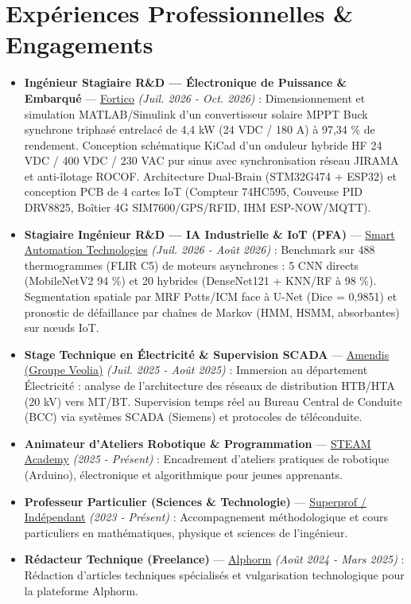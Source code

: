 \documentclass[10pt,a4paper]{article}
\begin{document}
\section*{Exp\'eriences Professionnelles \& Engagements}
\begin{itemize}
\item \textbf{Ingénieur Stagiaire R\&D --- Électronique de Puissance \& Embarqué} --- \href{https://sitewebfortico.vercel.app/fr}{Fortico} \textit{(Juil. 2026 - Oct. 2026)} : Dimensionnement et simulation MATLAB/Simulink d'un convertisseur solaire MPPT Buck synchrone triphasé entrelacé de 4,4 kW (24 VDC / 180 A) à 97,34 \% de rendement. Conception schématique KiCad d'un onduleur hybride HF 24 VDC / 400 VDC / 230 VAC pur sinus avec synchronisation réseau JIRAMA et anti-îlotage ROCOF. Architecture Dual-Brain (STM32G474 + ESP32) et conception PCB de 4 cartes IoT (Compteur 74HC595, Couveuse PID DRV8825, Boîtier 4G SIM7600/GPS/RFID, IHM ESP-NOW/MQTT).
\item \textbf{Stagiaire Ingénieur R\&D --- IA Industrielle \& IoT (PFA)} --- \href{https://www.linkedin.com/company/smart-automation-technologies/home/}{Smart Automation Technologies} \textit{(Juil. 2026 - Août 2026)} : Benchmark sur 488 thermogrammes (FLIR C5) de moteurs asynchrones : 5 CNN directs (MobileNetV2 94 \%) et 20 hybrides (DenseNet121 + KNN/RF à 98 \%). Segmentation spatiale par MRF Potts/ICM face à U-Net (Dice = 0,9851) et pronostic de défaillance par chaînes de Markov (HMM, HSMM, absorbantes) sur n\oe{}uds IoT.
\item \textbf{Stage Technique en Électricité \& Supervision SCADA} --- \href{https://www.amendis.ma/}{Amendis (Groupe Veolia)} \textit{(Juil. 2025 - Août 2025)} : Immersion au département Électricité : analyse de l'architecture des réseaux de distribution HTB/HTA (20 kV) vers MT/BT. Supervision temps réel au Bureau Central de Conduite (BCC) via systèmes SCADA (Siemens) et protocoles de téléconduite.
\item \textbf{Animateur d'Ateliers Robotique \& Programmation} --- \href{https://www.facebook.com/steamacademy.ma/}{STEAM Academy} \textit{(2025 - Présent)} : Encadrement d'ateliers pratiques de robotique (Arduino), électronique et algorithmique pour jeunes apprenants.
\item \textbf{Professeur Particulier (Sciences \& Technologie)} --- \href{https://www.superprof.ma/}{Superprof / Indépendant} \textit{(2023 - Présent)} : Accompagnement méthodologique et cours particuliers en mathématiques, physique et sciences de l'ingénieur.
\item \textbf{Rédacteur Technique (Freelance)} --- \href{https://www.alphorm.com/}{Alphorm} \textit{(Août 2024 - Mars 2025)} : Rédaction d'articles techniques spécialisés et vulgarisation technologique pour la plateforme Alphorm.

\end{itemize}
\end{document}

